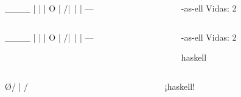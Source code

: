 \documentclass[spanish]{beamer}
\begin{document}

\begin{frame}[fragile]
  \begin{columns}[onlytextwidth,T]
    \begin{column}{.5\textwidth}
        \begin{code}
  ____
  |  |
  |  O
  | /|\
  |
  |
 ---
        \end{code}
    \end{column}
    \begin{column}{.5\textwidth}
      \begin{code}


 -as-ell          Vidas: 2




      \end{code}
    \end{column}
  \end{columns}
\end{frame}


\begin{frame}[fragile]
  \begin{columns}[onlytextwidth,T]
    \begin{column}{.5\textwidth}
        \begin{code}
  ____
  |  |
  |  O
  | /|\
  |
  |
 ---
        \end{code}
    \end{column}
    \begin{column}{.5\textwidth}
      \begin{code}


 -as-ell          Vidas: 2

 haskell


      \end{code}
    \end{column}
  \end{columns}
\end{frame}


\begin{frame}[fragile]
  \begin{columns}[onlytextwidth,T]
    \begin{column}{.5\textwidth}
        \begin{code}


    \O/
     |
    / \


        \end{code}
    \end{column}
    \begin{column}{.5\textwidth}
      \begin{code}


¡haskell!




      \end{code}
    \end{column}
  \end{columns}
\end{frame}
\end{document}
